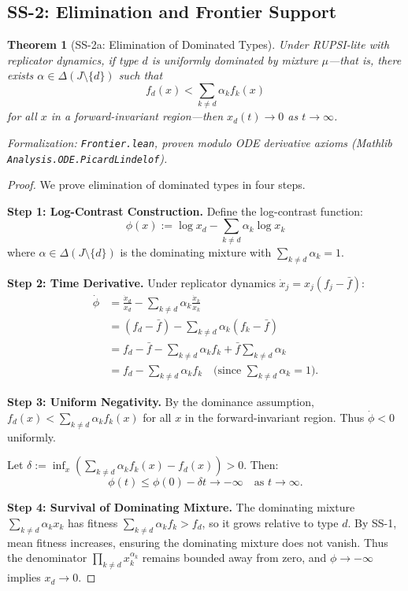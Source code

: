 \documentclass[12pt]{article}
\newtheorem{theorem}{Theorem}[section]
\begin{document}
\subsection{SS-2: Elimination and Frontier Support}

\begin{theorem}[SS-2a: Elimination of Dominated Types]
\label{thm:ss2a}
Under RUPSI-lite with replicator dynamics, if type $d$ is uniformly dominated by mixture $\mu$---that is, there exists $\alpha \in \Delta(J \setminus \{d\})$ such that
\[
f_d(x) < \sum_{k \neq d} \alpha_k f_k(x)
\]
for all $x$ in a forward-invariant region---then $x_d(t) \to 0$ as $t \to \infty$.
\end{theorem}
\noindent\textit{Formalization: \texttt{Frontier.lean}, proven modulo ODE derivative axioms (Mathlib \texttt{Analysis.ODE.PicardLindelof}).}

\begin{proof}
We prove elimination of dominated types in four steps.

\textbf{Step 1: Log-Contrast Construction.}
Define the log-contrast function:
\[
\phi(x) := \log x_d - \sum_{k \neq d} \alpha_k \log x_k
\]
where $\alpha \in \Delta(J \setminus \{d\})$ is the dominating mixture with $\sum_{k \neq d} \alpha_k = 1$.

\textbf{Step 2: Time Derivative.}
Under replicator dynamics $\dot{x}_j = x_j(f_j - \bar{f})$:
\begin{align*}
\dot{\phi} &= \frac{\dot{x}_d}{x_d} - \sum_{k \neq d} \alpha_k \frac{\dot{x}_k}{x_k} \\
&= (f_d - \bar{f}) - \sum_{k \neq d} \alpha_k (f_k - \bar{f}) \\
&= f_d - \bar{f} - \sum_{k \neq d} \alpha_k f_k + \bar{f} \sum_{k \neq d} \alpha_k \\
&= f_d - \sum_{k \neq d} \alpha_k f_k \quad \text{(since $\sum_{k \neq d} \alpha_k = 1$)}.
\end{align*}

\textbf{Step 3: Uniform Negativity.}
By the dominance assumption, $f_d(x) < \sum_{k \neq d} \alpha_k f_k(x)$ for all $x$ in the forward-invariant region. Thus $\dot{\phi} < 0$ uniformly.

Let $\delta := \inf_x \left( \sum_{k \neq d} \alpha_k f_k(x) - f_d(x) \right) > 0$. Then:
\[
\phi(t) \leq \phi(0) - \delta t \to -\infty \quad \text{as } t \to \infty.
\]

\textbf{Step 4: Survival of Dominating Mixture.}
The dominating mixture $\sum_{k \neq d} \alpha_k x_k$ has fitness $\sum_{k \neq d} \alpha_k f_k > f_d$, so it grows relative to type $d$. By SS-1, mean fitness increases, ensuring the dominating mixture does not vanish. Thus the denominator $\prod_{k \neq d} x_k^{\alpha_k}$ remains bounded away from zero, and $\phi \to -\infty$ implies $x_d \to 0$.
\end{proof}
\end{document}
